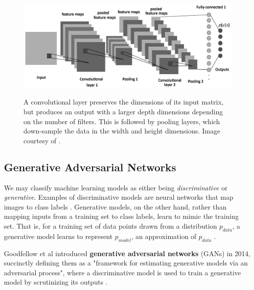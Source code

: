 \documentclass[12pt, titlepage]{report}
\theoremstyle{definition}
\begin{document}
\begin{figure}
\centering
\includegraphics[width=1\textwidth]{img/conv_pooling.png}\\
\caption{A convolutional layer preserves the dimensions of its input matrix, but produces an output with a larger depth dimensions depending on the number of filters. This is followed by pooling layers, which down-sample the data in the width and height dimensions. Image courtesy of  \cite{albelwi2017framework}.}
\label{figure:conv_pooling}
\end{figure}



\subsection{Generative Adversarial Networks}\label{subsection:generativeadversarial}
We may classify machine learning models as either being \textit{discriminative} or \textit{generative}. Examples of discriminative models are neural networks that map images to class labels \cite[p. 1]{goodfellow2014generative}. Generative models, on the other hand, rather than mapping inputs from a training set to class labels, learn to mimic the training set. That is, for a training set of data points drawn from a distribution $p_{data}$, a generative model learns to represent $p_{model}$, an approximation of $p_{data}$ \cite{goodfellow2016nips}.

Goodfellow et al introduced \textbf{generative adversarial networks} (GANs) in 2014, succinctly defining them as a "framework for estimating generative models via an adversarial process", where a discriminative model is used to train a generative model by scrutinizing its outputs \cite{goodfellow2014generative}.
\end{document}
